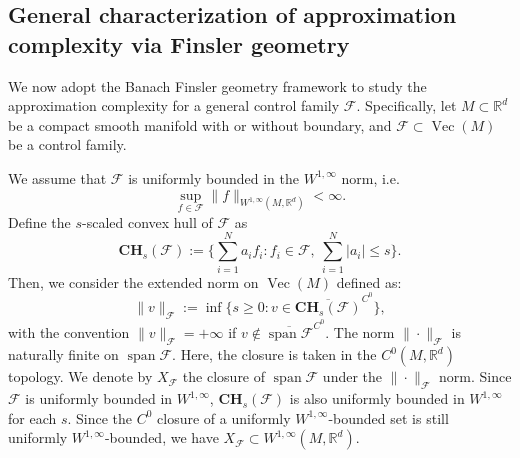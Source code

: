 \documentclass[12pt]{amsart}
\numberwithin{equation}{section}
\theoremstyle{remark}
\begin{document}

\subsection{General characterization of approximation complexity via Finsler geometry}
\label{sec:main_results_general}
We now adopt the Banach Finsler geometry framework to study the approximation complexity for
a general control family $\mathcal F$.
Specifically, let $M \subset \mathbb R^d$ be a compact smooth manifold with or without boundary,
and $\mathcal F \subset \operatorname{Vec}(M)$ be a control family.

We assume that $\mathcal F$ is uniformly bounded in the $W^{1,\infty}$ norm, i.e.
\begin{equation}
  \sup_{f\in\mathcal F}\|f\|_{W^{1,\infty}(M,\mathbb R^d)}<\infty.
\end{equation}
Define the $s$-scaled convex hull of $\mathcal F$ as
\begin{equation}
    \label{eq:CH_def}
\mathbf{CH}_s(\mathcal F)
:= \Big\{\sum_{i=1}^N a_i f_i : f_i\in \mathcal F,\ \sum_{i=1}^N |a_i| \le s \Big\}.
\end{equation}
Then, we consider the extended norm on $\operatorname{Vec}(M)$ defined as:
\begin{equation}
\|v\|_{\mathcal F} := \inf\{s\ge 0 : v \in \overline{\mathbf{CH}_s(\mathcal F)}^{C^0}\},
\end{equation}
with the convention $\|v\|_{\mathcal F}=+\infty$ if $v\notin \overline{\operatorname{span}\mathcal F}^{C^0}$. 
The norm $\|\cdot\|_{\mathcal F}$ is naturally finite on $\operatorname{span}\mathcal F$. Here, the closure is taken in the $C^0(M,\mathbb R^d)$ topology.
 We denote by $X_{\mathcal F}$ the closure of $\operatorname{span}\mathcal F$ under the $\|\cdot\|_{\mathcal F}$ norm.
Since $\mathcal F$ is uniformly bounded in $W^{1,\infty}$, $\mathbf{CH}_s(\mathcal F)$ is also uniformly bounded in $W^{1,\infty}$ for each $s$. Since the $C^0$ closure of a uniformly $W^{1,\infty}$-bounded set is still uniformly $W^{1,\infty}$-bounded, we have $X_{\mathcal F} \subset W^{1,\infty}(M,\mathbb R^d)$.
\end{document}
